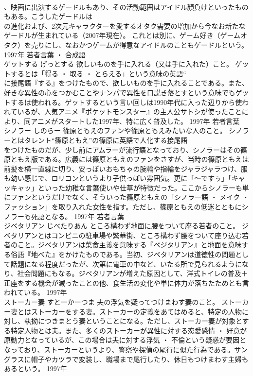 \documentclass[8pt]{extreport}
\begin{document}
\begin{CJK}{UTF8}{min}
\\	、映画に出演するゲードルもあり、その活動範囲はアイドル顔負けといったものもある。こうしたゲードルは
\\	の進化および、2次元キャラクターを愛するオタク需要の増加から今なお新たなゲードルが生まれている（2007年現在）。 これとは別に、ゲーム好き（ゲームオタク）を売りにし、なおかつゲームが得意なアイドルのこともゲードルという。	1997年	若者言葉 ・ 合成語	
\\	ゲットする	げっとする	欲しいものを手に入れる（又は手に入れた）こと。	ゲットするとは「得る ・ 取る ・ とらえる」という意味の英語“
\\	に接尾語『する』をつけたもので、欲しいものを手に入れることである。また、好きな異性の心をつかむことやナンパで異性を口説き落とすという意味でもゲットするは使われる。ゲットするという言い回しは1990年代に入った辺りから使われているが、人気アニメ『ポケットモンスター』の主人公サトシが使ったことにより、同アニメがスタートした1997年、特に広く普及した。	1997年	若者言葉	
\\	シノラー	しのらー	篠原ともえのファンや篠原ともえみたいな人のこと。	シノラーとはタレント“篠原ともえ”の篠原に英語で人化する接尾語
\\	をつけたものだが、少し前にアムラーが流行語となっており、シノラーはその篠原ともえ版である。広義には篠原ともえのファンをさすが、当時の篠原ともえは前髪を横一直線に切り、安っぽいおもちゃの腕輪や指輪をジャラジャラつけ、服も幼い感じで、ロリコンというより子供っぽい雰囲気。更に「～ですぅ」「キャッキャッ」といった幼稚な言葉使いや仕草が特徴だった。ここからシノラーも単にファンというだけでなく、そういった篠原ともえの「シノラー語 ・ メイク ・ ファッション」を取り入れた女性を指す。ただし、篠原ともえの低迷とともにシノラーも死語となる。	1997年	若者言葉	
\\	ジベタリアン	じべたりあん	ところ構わず地面に腰をついて座る若者のこと。	ジベタリアンとはコンビニの駐車場や繁華街、ところ構わず腰をついて座り込む若者のこと。ジベタリアンは菜食主義を意味する『ベジタリアン』と地面を意味する俗語『地べた』をかけたものである。当初、ジベタリアンは道徳性の問題として話題になる程度だったが、次第に電車の中など、いたる所で見られるようになり、社会問題にもなる。ジベタリアンが増えた原因として、洋式トイレの普及＋正座をする機会が減ったことの他、食生活の変化や単に体力が落ちたためとも言われている。	1997年	
\\	ストーカー妻	すとーかーつま	夫の浮気を疑ってつけまわす妻のこと。	ストーカー妻とはストーカーをする妻。ストーカーの定義をあてはめると、特定の人物に対し、執拗につきまとう妻ということになる。ただし、ストーカー妻が対象とする特定人物とは夫。また、多くのストーカーが異性に対する恋愛感情 ・ 好意が原動力となっているが、この場合は夫に対する浮気 ・ 不倫という疑惑が要因となっており、ストーカーというより、警察や探偵の尾行に似た行為である。サングラスに帽子やカツラで変装し、職場まで尾行したり、休日もつけまわす主婦もあるという。	1997年	

\end{CJK}
\end{document}
